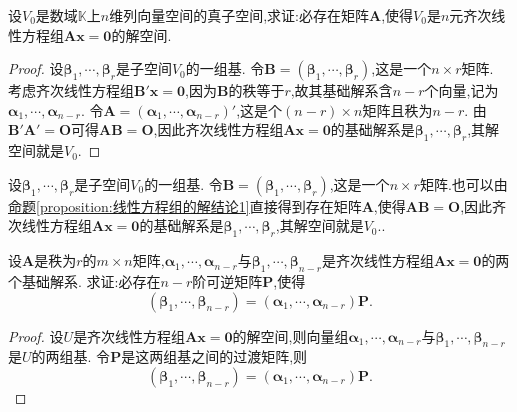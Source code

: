 \documentclass[../../main.tex]{subfiles}%
\begin{document}
\begin{proposition}\label{proposition:一个线性子空间对应一个线性方程组的系数矩阵}
设\(V_0\)是数域\(\mathbb{K}\)上\(n\)维列向量空间的真子空间,求证:必存在矩阵\(\boldsymbol{A}\),使得\(V_0\)是\(n\)元齐次线性方程组\(\boldsymbol{A}\boldsymbol{x}=\boldsymbol{0}\)的解空间.
\end{proposition}
\begin{proof}
设\(\boldsymbol{\beta}_1,\cdots,\boldsymbol{\beta}_r\)是子空间\(V_0\)的一组基. 令\(\boldsymbol{B}=(\boldsymbol{\beta}_1,\cdots,\boldsymbol{\beta}_r)\),这是一个\(n\times r\)矩阵. 考虑齐次线性方程组\(\boldsymbol{B}'\boldsymbol{x}=\boldsymbol{0}\),因为\(\boldsymbol{B}\)的秩等于\(r\),故其基础解系含\(n - r\)个向量,记为\(\boldsymbol{\alpha}_1,\cdots,\boldsymbol{\alpha}_{n - r}\). 令\(\boldsymbol{A}=(\boldsymbol{\alpha}_1,\cdots,\boldsymbol{\alpha}_{n - r})'\),这是个\((n - r)\times n\)矩阵且秩为\(n - r\). 由\(\boldsymbol{B}'\boldsymbol{A}'=\boldsymbol{O}\)可得\(\boldsymbol{A}\boldsymbol{B}=\boldsymbol{O}\),因此齐次线性方程组\(\boldsymbol{A}\boldsymbol{x}=\boldsymbol{0}\)的基础解系是\(\boldsymbol{\beta}_1,\cdots,\boldsymbol{\beta}_r\),其解空间就是\(V_0\).
\end{proof}
\begin{remark}
设\(\boldsymbol{\beta}_1,\cdots,\boldsymbol{\beta}_r\)是子空间\(V_0\)的一组基. 令\(\boldsymbol{B}=(\boldsymbol{\beta}_1,\cdots,\boldsymbol{\beta}_r)\),这是一个\(n\times r\)矩阵.也可以由\hyperref[proposition:线性方程组的解结论1]{命题\ref{proposition:线性方程组的解结论1}}直接得到存在矩阵$\boldsymbol{A}$,使得\(\boldsymbol{A}\boldsymbol{B}=\boldsymbol{O}\),因此齐次线性方程组\(\boldsymbol{A}\boldsymbol{x}=\boldsymbol{0}\)的基础解系是\(\boldsymbol{\beta}_1,\cdots,\boldsymbol{\beta}_r\),其解空间就是\(V_0\)..
\end{remark}

\begin{example}
设\(\boldsymbol{A}\)是秩为\(r\)的\(m\times n\)矩阵,\(\boldsymbol{\alpha}_1,\cdots,\boldsymbol{\alpha}_{n - r}\)与\(\boldsymbol{\beta}_1,\cdots,\boldsymbol{\beta}_{n - r}\)是齐次线性方程组\(\boldsymbol{A}\boldsymbol{x}=\boldsymbol{0}\)的两个基础解系. 求证:必存在\(n - r\)阶可逆矩阵\(\boldsymbol{P}\),使得
\[
(\boldsymbol{\beta}_1,\cdots,\boldsymbol{\beta}_{n - r})=(\boldsymbol{\alpha}_1,\cdots,\boldsymbol{\alpha}_{n - r})\boldsymbol{P}.
\]
\end{example}
\begin{proof}
设\(U\)是齐次线性方程组\(\boldsymbol{A}\boldsymbol{x}=\boldsymbol{0}\)的解空间,则向量组\(\boldsymbol{\alpha}_1,\cdots,\boldsymbol{\alpha}_{n - r}\)与\(\boldsymbol{\beta}_1,\cdots,\boldsymbol{\beta}_{n - r}\)是\(U\)的两组基. 令\(\boldsymbol{P}\)是这两组基之间的过渡矩阵,则
\[
(\boldsymbol{\beta}_1,\cdots,\boldsymbol{\beta}_{n - r})=(\boldsymbol{\alpha}_1,\cdots,\boldsymbol{\alpha}_{n - r})\boldsymbol{P}. 
\]  
\end{proof}
\end{document}
